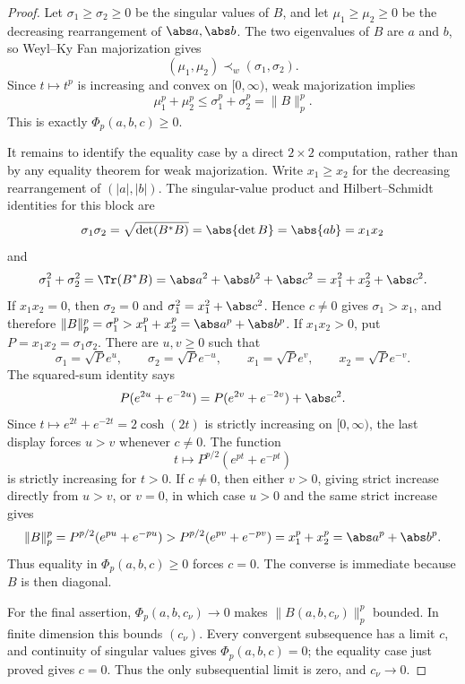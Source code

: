 \begin{proof}
  Let \(\sigma_1\ge\sigma_2\ge0\) be the singular values of \(B\), and let
  \(\mu_1\ge\mu_2\ge0\) be the decreasing rearrangement of
  \(\abs a,\abs b\). The two eigenvalues of \(B\) are \(a\) and \(b\), so
  Weyl--Ky Fan majorization gives
  \[
    (\mu_1,\mu_2)\prec_w(\sigma_1,\sigma_2).
  \]
  Since \(t\mapsto t^p\) is increasing and convex on
  \([0,\infty)\), weak majorization implies
  \[
    \mu_1^p+\mu_2^p\le \sigma_1^p+\sigma_2^p=\|B\|_p^p.
  \]
  This is exactly \(\Phi_p(a,b,c)\ge0\).

  It remains to identify the equality case by a direct \(2\times2\)
  computation, rather than by any equality theorem for weak majorization.  Write
  \(x_1\ge x_2\) for the decreasing rearrangement of
  \((|a|,|b|)\).  The singular-value product and Hilbert--Schmidt identities
  for this block are
  \[
    \sigma_1\sigma_2
    =\sqrt{\det(B^*B)}
    =\abs{\det B}
    =\abs{ab}
    =x_1x_2
  \]
  and
  \[
    \sigma_1^2+\sigma_2^2
    =\Tr(B^*B)
    =\abs a^2+\abs b^2+\abs c^2
    =x_1^2+x_2^2+\abs c^2 .
  \]
  If \(x_1x_2=0\), then \(\sigma_2=0\) and
  \(\sigma_1^2=x_1^2+\abs c^2\).  Hence \(c\ne0\) gives
  \(\sigma_1>x_1\), and therefore
  \(\|B\|_p^p=\sigma_1^p>x_1^p+x_2^p=\abs a^p+\abs b^p\).
  If \(x_1x_2>0\), put \(P=x_1x_2=\sigma_1\sigma_2\).  There are
  \(u,v\ge0\) such that
  \[
    \sigma_1=\sqrt P e^u,
    \qquad
    \sigma_2=\sqrt P e^{-u},
    \qquad
    x_1=\sqrt P e^v,
    \qquad
    x_2=\sqrt P e^{-v}.
  \]
  The squared-sum identity says
  \[
    P(e^{2u}+e^{-2u})
    =P(e^{2v}+e^{-2v})+\abs c^2.
  \]
  Since \(t\mapsto e^{2t}+e^{-2t}
  =2\cosh(2t)\) is strictly increasing on \([0,\infty)\), the last display
  forces \(u>v\) whenever \(c\ne0\).  The function
  \[
    t\longmapsto P^{p/2}(e^{pt}+e^{-pt})
  \]
  is strictly increasing for \(t>0\).  If \(c\ne0\), then either
  \(v>0\), giving strict increase directly from \(u>v\), or \(v=0\), in
  which case \(u>0\) and the same strict increase gives
  \[
    \|B\|_p^p
    =P^{p/2}(e^{pu}+e^{-pu})
    >P^{p/2}(e^{pv}+e^{-pv})
    =x_1^p+x_2^p
    =\abs a^p+\abs b^p .
  \]
  Thus equality in \(\Phi_p(a,b,c)\ge0\) forces \(c=0\). The converse is
  immediate because \(B\) is then diagonal.

  For the final assertion, \(\Phi_p(a,b,c_\nu)\to0\) makes
  \(\|B(a,b,c_\nu)\|_p^p\) bounded.  In finite dimension this bounds
  \((c_\nu)\).  Every convergent subsequence has a limit \(c\), and
  continuity of singular values gives \(\Phi_p(a,b,c)=0\); the equality
  case just proved gives \(c=0\).  Thus the only subsequential limit is
  zero, and \(c_\nu\to0\).
\end{proof}

